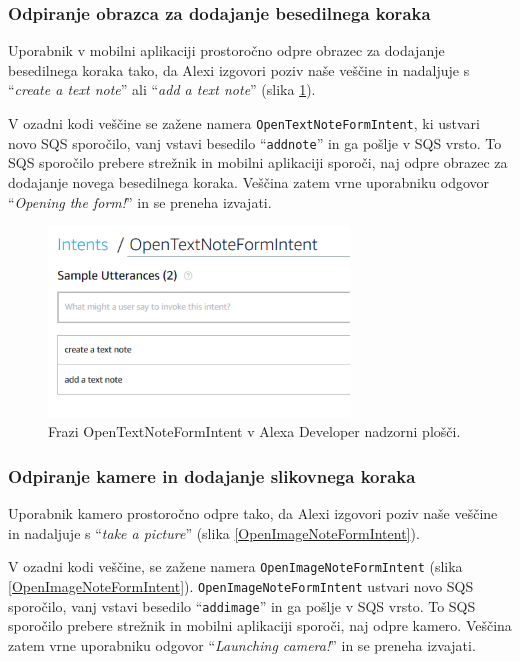 \documentclass[a4paper, 12pt]{book}
\begin{document}
\subsubsection{Odpiranje obrazca za dodajanje besedilnega koraka}

Uporabnik v mobilni aplikaciji prostoročno odpre obrazec za dodajanje besedilnega koraka tako, da Alexi izgovori poziv naše veščine in nadaljuje s \enquote{\textit{create a text note}} ali \enquote{\textit{add a text note}} (slika \ref{OpenTextNoteFormIntent}).

V ozadni kodi veščine se zažene namera \texttt{OpenTextNoteFormIntent}, ki ustvari novo SQS sporočilo, vanj vstavi besedilo \enquote{\texttt{addnote}} in ga pošlje v SQS vrsto.
To SQS sporočilo prebere strežnik in mobilni aplikaciji sporoči, naj odpre obrazec za dodajanje novega besedilnega koraka.
Veščina zatem vrne uporabniku odgovor \enquote{\textit{Opening the form!}} in se preneha izvajati.

\begin{figure}[H]
\begin{center}
\includegraphics[width=8cm]{intent_text}
\end{center}
\caption{Frazi OpenTextNoteFormIntent v Alexa Developer nadzorni plošči.}
\label{OpenTextNoteFormIntent}
\end{figure}


\subsubsection{Odpiranje kamere in dodajanje slikovnega koraka}

Uporabnik kamero prostoročno odpre tako, da Alexi izgovori poziv naše veščine in nadaljuje s \enquote{\textit{take a picture}} (slika \ref{OpenImageNoteFormIntent}).

V ozadni kodi veščine, se zažene namera \texttt{OpenImageNoteFormIntent} (slika \ref{OpenImageNoteFormIntent}).
\texttt{OpenImageNoteFormIntent} ustvari novo SQS sporočilo, vanj vstavi besedilo \enquote{\texttt{addimage}} in ga pošlje v SQS vrsto.
To SQS sporočilo prebere strežnik in mobilni aplikaciji sporoči, naj odpre kamero.
Veščina zatem vrne uporabniku odgovor \enquote{\textit{Launching camera!}} in se preneha izvajati.
\end{document}
